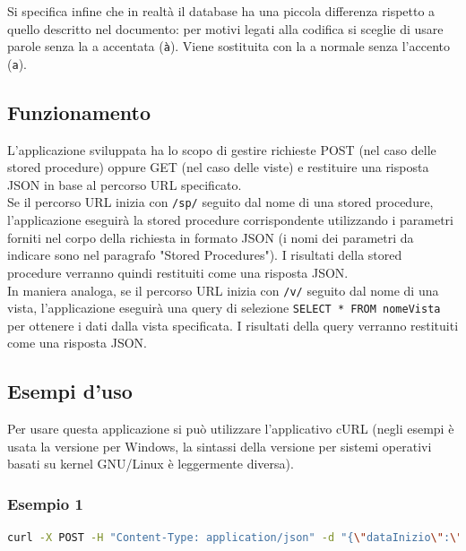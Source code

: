 \documentclass[a4paper, 10pt, oneside]{article} %
\begin{document}
Si specifica infine che in realtà il database ha una piccola differenza rispetto a quello descritto nel documento: per motivi legati alla codifica si sceglie di usare parole senza la a accentata (\texttt{à}). Viene sostituita con la a normale senza l'accento (\texttt{a}).

\subsection{Funzionamento}

L'applicazione sviluppata ha lo scopo di gestire richieste POST (nel caso delle stored procedure) oppure GET (nel caso delle viste) e restituire una risposta JSON in base al percorso URL specificato.\\

Se il percorso URL inizia con \texttt{/sp/} seguito dal nome di una stored procedure, l'applicazione eseguirà la stored procedure corrispondente utilizzando i parametri forniti nel corpo della richiesta in formato JSON (i nomi dei parametri da indicare sono nel paragrafo "Stored Procedures"). I risultati della stored procedure verranno quindi restituiti come una risposta JSON.\\

In maniera analoga, se il percorso URL inizia con \texttt{/v/} seguito dal nome di una vista, l'applicazione eseguirà una query di selezione \texttt{SELECT * FROM nomeVista} per ottenere i dati dalla vista specificata. I risultati della query verranno restituiti come una risposta JSON.

\subsection{Esempi d'uso}

Per usare questa applicazione si può utilizzare l'applicativo cURL (negli esempi è usata la versione per Windows, la sintassi della versione per sistemi operativi basati su kernel GNU/Linux è leggermente diversa).

\lstset{
basicstyle=\ttfamily,
breaklines=true,
columns=fullflexible,
frame=single,
showstringspaces=false
}

\subsubsection*{Esempio 1}
\begin{lstlisting}[language=bash]
curl -X POST -H "Content-Type: application/json" -d "{\"dataInizio\":\"2010-05-16\",\"dataFine\":\"2023-05-18\",\"aulaID\":2}" http://localhost:5000/sp/ElencoPrenotazioniAula
\end{lstlisting}
\end{document}
